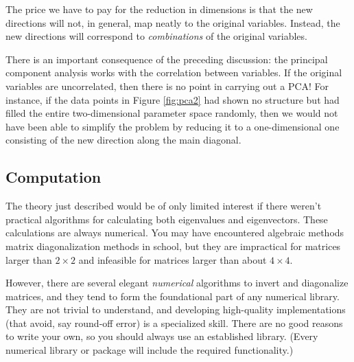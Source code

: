 The price we have to pay for the reduction in dimensions is that the
new directions will not, in general, map neatly to the original
variables. Instead, the new directions will correspond to
\emph{combinations} of the original variables.

There is an important consequence of the preceding discussion: the
principal component analysis works with the correlation between
variables. If the original variables are uncorrelated, then there is
no point in carrying out a PCA! For instance, if the data points in
Figure \ref{fig:pca2} had shown no structure but had filled the
entire two-dimensional parameter space randomly, then we would not
have been able to simplify the problem by reducing it to a
one-dimensional one consisting of the new direction along the main
diagonal.

% 


\subsection{Computation}

 
The theory just described would be of only limited interest if there
weren't practical algorithms for calculating both eigenvalues and
eigenvectors.  These calculations are always numerical.  You may have
encountered algebraic methods matrix diagonalization methods in
school, but they are impractical for matrices larger than $2 \times 2$
and infeasible for matrices larger than about $4 \times 4$.

However, there are several elegant \emph{numerical} algorithms to
invert and diagonalize matrices, and they tend to form the
foundational part of any numerical library. They are not trivial to
understand, and developing high-quality implementations (that avoid,
say round-off error) is a specialized skill. There are no good
reasons to write your own, so you should always use an established
library. (Every numerical library or package will include the required
functionality.)

